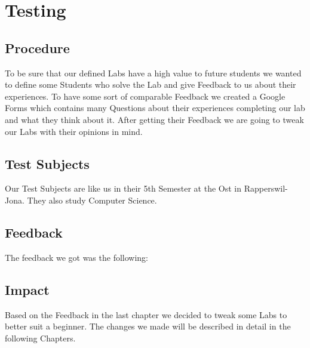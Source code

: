 \chapter{Testing}
\section{Procedure}
To be sure that our defined Labs have a high value to future students we wanted to define some Students who solve the Lab and give Feedback to us about their experiences. To have some sort of comparable Feedback we created a Google Forms which contains many Questions about their experiences completing our lab and what they think about it. After getting their Feedback we are going to tweak our Labs with their opinions in mind.

\section{Test Subjects}
Our Test Subjects are like us in their 5th Semester at the Ost in Rapperswil-Jona. They also study Computer Science.

\section{Feedback}
The feedback we got was the following:

\section{Impact}
Based on the Feedback in the last chapter we decided to tweak some Labs to better suit a beginner. The changes we made will be described in detail in the following Chapters.